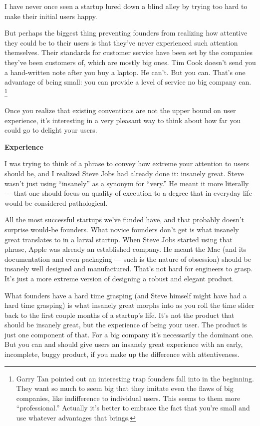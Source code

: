 \documentclass[12pt]{book}
\begin{document}
I have never once seen a startup lured down a blind alley by trying too
hard to make their initial users happy.

But perhaps the biggest thing preventing founders from realizing how
attentive they could be to their users is that they've never experienced
such attention themselves. Their standards for customer service have
been set by the companies they've been customers of, which are mostly
big ones. Tim Cook doesn't send you a hand-written note after you buy a
laptop. He can't. But you can. That's one advantage of being small: you
can provide a level of service no big company can.
\footnote{Garry Tan pointed out an interesting trap founders fall into in
the beginning. They want so much to seem big that they imitate even the
flaws of big companies, like indifference to individual users. This
seems to them more ``professional.'' Actually it's better to embrace the
fact that you're small and use whatever advantages that brings.}

Once you realize that existing conventions are not the upper bound on
user experience, it's interesting in a very pleasant way to think about
how far you could go to delight your users.

\textbf{Experience}

I was trying to think of a phrase to convey how extreme your attention
to users should be, and I realized Steve Jobs had already done it:
insanely great. Steve wasn't just using ``insanely'' as a synonym for
``very.'' He meant it more literally --- that one should focus on
quality of execution to a degree that in everyday life would be
considered pathological.

All the most successful startups we've funded have, and that probably
doesn't surprise would-be founders. What novice founders don't get is
what insanely great translates to in a larval startup. When Steve Jobs
started using that phrase, Apple was already an established company. He
meant the Mac (and its documentation and even packaging --- such is the
nature of obsession) should be insanely well designed and manufactured.
That's not hard for engineers to grasp. It's just a more extreme version
of designing a robust and elegant product.

What founders have a hard time grasping (and Steve himself might have
had a hard time grasping) is what insanely great morphs into as you roll
the time slider back to the first couple months of a startup's life.
It's not the product that should be insanely great, but the experience
of being your user. The product is just one component of that. For a big
company it's necessarily the dominant one. But you can and should give
users an insanely great experience with an early, incomplete, buggy
product, if you make up the difference with attentiveness.
\end{document}
